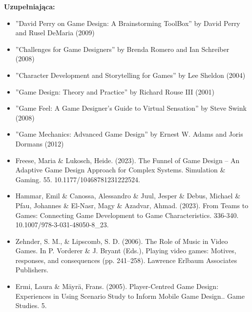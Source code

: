 \documentclass[12pt, a4paper]{article}
\begin{document}
\textbf{Uzupełniająca:}
\begin{itemize}
  \item ''David Perry on Game Design: A Brainstorming ToolBox'' by David Perry and Rusel DeMaria (2009)
  \item ''Challenges for Game Designers'' by Brenda Romero and Ian Schreiber (2008)
  \item ''Character Development and Storytelling for Games'' by Lee Sheldon (2004)
  \item ''Game Design: Theory and Practice'' by Richard Rouse III (2001)
  \item ''Game Feel: A Game Designer's Guide to Virtual Sensation'' by Steve Swink (2008)
  \item ''Game Mechanics: Advanced Game Design'' by Ernest W. Adams and Joris Dormans (2012)
  \item Freese, Maria \& Lukosch, Heide. (2023). The Funnel of Game Design – An Adaptive Game Design Approach for Complex Systems. Simulation \& Gaming. 55. 10.1177/10468781231222524.
  \item Hammar, Emil \& Canossa, Alessandro \& Juul, Jesper \& Debus, Michael \& Pfau, Johannes \& El-Nasr, Magy \& Azadvar, Ahmad. (2023). From Teams to Games: Connecting Game Development to Game Characteristics. 336-340. 10.1007/978-3-031-48050-8\_23.
  \item Zehnder, S. M., \& Lipscomb, S. D. (2006). The Role of Music in Video Games. In P. Vorderer \& J. Bryant (Eds.), Playing video games: Motives, responses, and consequences (pp. 241–258). Lawrence Erlbaum Associates Publishers.
  \item Ermi, Laura \& Mäyrä, Frans. (2005). Player-Centred Game Design: Experiences in Using Scenario Study to Inform Mobile Game Design.. Game Studies. 5.
\end{itemize}
\end{document}
